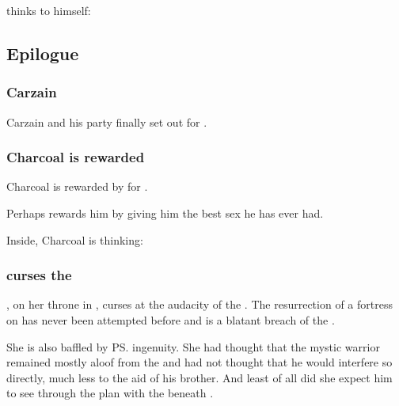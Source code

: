 \Ishnaruchaefir{} thinks to himself: 







\subsection{Epilogue}
\subsubsection{Carzain}
Carzain and his party finally set out for \Redce. 





\subsubsection{Charcoal is rewarded}
Charcoal is rewarded by \Achsah{} for .

Perhaps \Achsah{} rewards him by giving him the best sex he has ever had.

Inside, Charcoal is thinking: 





\subsubsection{\Achsah{} curses the \dragons}
\Achsah, on her throne in \Nyx, curses at the audacity of the \dragons. The resurrection of a \Machaic{} fortress on \Miith{} has never been attempted before and is a blatant breach of the \charade. 

She is also baffled by \ps{\Ishnaruchaefir} ingenuity. She had thought that the mystic warrior remained mostly aloof from the \secretwar{} and had not thought that he would interfere so directly, much less to the aid of his brother. And least of all did she expect him to see through the plan with the \noggyaleth{} beneath \Malcur. 

